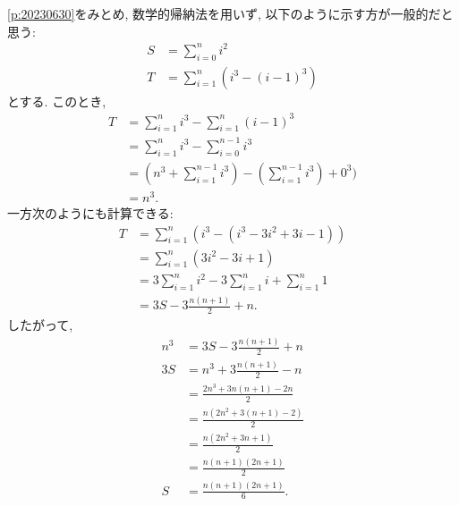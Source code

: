 \begin{rem}
  \cref{p:20230630}をみとめ,
  数学的帰納法を用いず, 以下のように示す方が一般的だと思う:
  \begin{align*}
    S&=\sum_{i=0}^n i^2\\
    T&=\sum_{i=1}^{n}(i^3-(i-1)^3)
  \end{align*}
  とする.
  このとき,
  \begin{align*}
    T&=\sum_{i=1}^{n}i^3-\sum_{i=1}^n (i-1)^3\\
    &=\sum_{i=1}^{n}i^3-\sum_{i=0}^{n-1} i^3\\
    &=(n^3+\sum_{i=1}^{n-1}i^3)-(\sum_{i=1}^{n-1} i^3)+0^3)\\
    &=n^3.
  \end{align*}
  一方次のようにも計算できる:
  \begin{align*}
    T
    &=\sum_{i=1}^{n}(i^3- (i^3-3i^2+3i-1))\\
    &=\sum_{i=1}^{n}(3i^2-3i+1)\\
    &=3\sum_{i=1}^{n}i^2-3\sum_{i=1}^{n}i+\sum_{i=1}^{n}1\\
    &=3S-3\frac{n(n+1)}{2}+n.
  \end{align*}
  したがって,
  \begin{align*}
    n^3&=3S-3\frac{n(n+1)}{2}+n\\
    3S&=n^3+3\frac{n(n+1)}{2}-n\\
    &=\frac{2n^3+3n(n+1)-2n}{2}\\
    &=\frac{n(2n^2+3(n+1)-2)}{2}\\
    &=\frac{n(2n^2+3n+1)}{2}\\
    &=\frac{n(n+1)(2n+1)}{2}\\
    S&=\frac{n(n+1)(2n+1)}{6}.
  \end{align*}
\end{rem}

